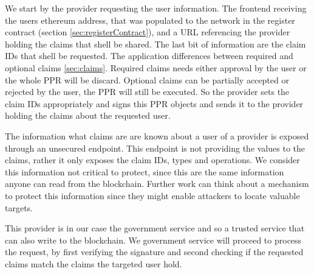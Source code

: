We start by the provider requesting the user information. The frontend receiving the users ethereum address, that was populated to the network in the register contract (section \ref{sec:registerContract}), and a URL referencing the provider holding the claims that shell be shared. The last bit of information are the claim IDs that shell be requested. The application differences between required and optional claims \ref{sec:claims}. Required claims needs either approval by the user or the whole PPR will be discard. Optional claims can be partially accepted or rejected by the user, the PPR will still be executed. So the provider sets the claim IDs appropriately and signs this PPR objects and sends it to the provider holding the claims about the requested user.

The information what claims are are known about a user of a provider is exposed through an unsecured endpoint. This endpoint is not providing the values to the claims, rather it only exposes the claim IDs, types and operations. We consider this information not critical to protect, since this are the same information anyone can read from the blockchain. Further work can think about a mechanism to protect this information since they might enable attackers to locate valuable targets. 

This provider is in our case the government service and so a trusted service that can also write to the blockchain. We government service will proceed to process the request, by first verifying the signature and second checking if the requested claims match the claims the targeted user hold. 
